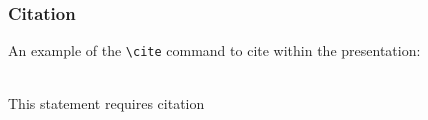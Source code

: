 \documentclass[aspectratio=169,xcolor=dvipsnames, t]{beamer}
\begin{document}
    \begin{frame}[fragile] %
        \frametitle{Citation}
        An example of the \verb|\cite| command to cite within the presentation:\\~
                
        This statement requires citation \cite{ahmed2013distributed}
    \end{frame}


    \makefinalpage
\end{document}
